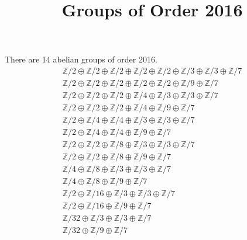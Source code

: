 \documentclass{amsart}
\title{Groups of Order 2016}
\newcommand{\Z}{\mathbb Z}
\begin{document}
\maketitle
There are 14 abelian groups of order 2016.
\begin{gather*}
\Z/2\oplus\Z/2\oplus\Z/2\oplus\Z/2\oplus\Z/2\oplus\Z/3\oplus\Z/3\oplus\Z/7\\
\Z/2\oplus\Z/2\oplus\Z/2\oplus\Z/2\oplus\Z/2\oplus\Z/9\oplus\Z/7\\
\Z/2\oplus\Z/2\oplus\Z/2\oplus\Z/4\oplus\Z/3\oplus\Z/3\oplus\Z/7\\
\Z/2\oplus\Z/2\oplus\Z/2\oplus\Z/4\oplus\Z/9\oplus\Z/7\\
\Z/2\oplus\Z/4\oplus\Z/4\oplus\Z/3\oplus\Z/3\oplus\Z/7\\
\Z/2\oplus\Z/4\oplus\Z/4\oplus\Z/9\oplus\Z/7\\
\Z/2\oplus\Z/2\oplus\Z/8\oplus\Z/3\oplus\Z/3\oplus\Z/7\\
\Z/2\oplus\Z/2\oplus\Z/8\oplus\Z/9\oplus\Z/7\\
\Z/4\oplus\Z/8\oplus\Z/3\oplus\Z/3\oplus\Z/7\\
\Z/4\oplus\Z/8\oplus\Z/9\oplus\Z/7\\
\Z/2\oplus\Z/16\oplus\Z/3\oplus\Z/3\oplus\Z/7\\
\Z/2\oplus\Z/16\oplus\Z/9\oplus\Z/7\\
\Z/32\oplus\Z/3\oplus\Z/3\oplus\Z/7\\
\Z/32\oplus\Z/9\oplus\Z/7
\end{gather*}
\end{document}
